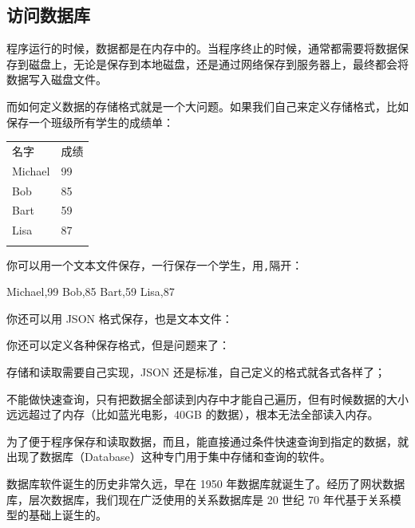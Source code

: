 \hypertarget{ux8bbfux95eeux6570ux636eux5e93}{%
\subsection{访问数据库}\label{ux8bbfux95eeux6570ux636eux5e93}}

程序运行的时候，数据都是在内存中的。当程序终止的时候，通常都需要将数据保存到磁盘上，无论是保存到本地磁盘，还是通过网络保存到服务器上，最终都会将数据写入磁盘文件。

而如何定义数据的存储格式就是一个大问题。如果我们自己来定义存储格式，比如保存一个班级所有学生的成绩单：

\begin{longtable}[]{@{}ll@{}}
\toprule
名字 & 成绩 \\ \addlinespace
\midrule
\endhead
Michael & 99 \\ \addlinespace
Bob & 85 \\ \addlinespace
Bart & 59 \\ \addlinespace
Lisa & 87 \\ \addlinespace
\bottomrule
\end{longtable}

你可以用一个文本文件保存，一行保存一个学生，用\texttt{,}隔开：

\begin{pythoncode}
Michael,99
Bob,85
Bart,59
Lisa,87
\end{pythoncode}

你还可以用 JSON 格式保存，也是文本文件：

\begin{pythoncode}
\end{pythoncode}

你还可以定义各种保存格式，但是问题来了：

存储和读取需要自己实现，JSON 还是标准，自己定义的格式就各式各样了；

不能做快速查询，只有把数据全部读到内存中才能自己遍历，但有时候数据的大小远远超过了内存（比如蓝光电影，40GB
的数据），根本无法全部读入内存。

为了便于程序保存和读取数据，而且，能直接通过条件快速查询到指定的数据，就出现了数据库（Database）这种专门用于集中存储和查询的软件。

数据库软件诞生的历史非常久远，早在 1950
年数据库就诞生了。经历了网状数据库，层次数据库，我们现在广泛使用的关系数据库是
20 世纪 70 年代基于关系模型的基础上诞生的。

